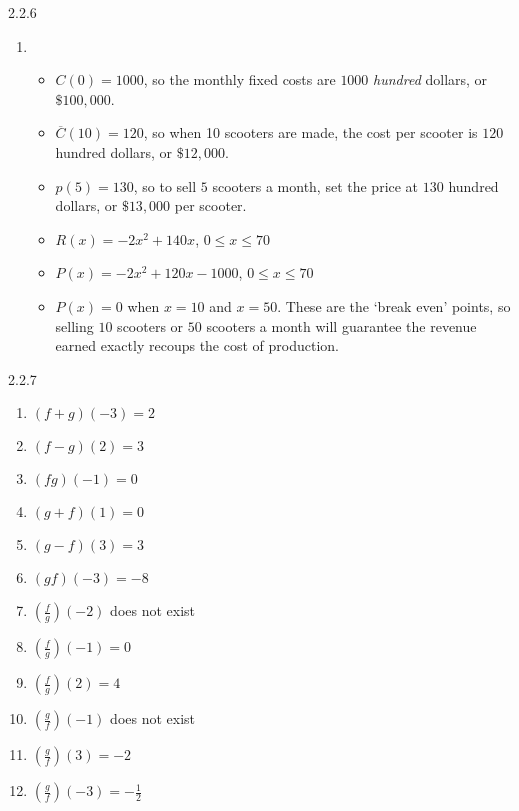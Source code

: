 \begin{Answer}{2.2.6}
\begin{enumerate}
\begin{itemize}
		\end{itemize}

		\item  \begin{itemize}

			\item  $C(0) = 1000$, so the monthly fixed costs are $1000$ \textit{hundred} dollars, or $\$100,\!000$.

			\item  $\overline{C}(10) = 120$, so when 10 scooters are made, the cost per scooter is $120$ hundred dollars, or $\$12,\!000$.

			\item  $p(5) = 130$, so to sell $5$ scooters a month, set the price at $130$ hundred dollars, or $\$13,\!000$ per scooter.

			\item $R(x) = -2x^2+140x$, $0 \leq x \leq 70$

			\item  $P(x) = -2x^2+120x-1000$, $0 \leq x \leq 70$

			\item  $P(x) = 0$ when $x = 10$ and $x=50$.  These are the `break even' points, so selling $10$ scooters or $50$ scooters a month will guarantee the revenue earned exactly recoups the cost of production.

		\end{itemize}

	\end{enumerate}

	
\end{Answer}
\begin{Answer}{2.2.7}

\begin{multicols}{2}
	\begin{enumerate}

		\item $(f + g)(-3) = 2$
		\item $(f - g)(2) = 3$
		\item $(fg)(-1) = 0$
		\item $(g + f)(1) = 0$
		\item $(g - f)(3) = 3$
		\item $(gf)(-3) = -8$
		\item $\left(\frac{f}{g}\right)(-2)$ does not exist
		\item $\left(\frac{f}{g}\right)(-1) = 0$
		\item $\left(\frac{f}{g}\right)(2) = 4$
		\item $\left(\frac{g}{f}\right)(-1)$ does not exist
		\item $\left(\frac{g}{f}\right)(3) = -2$
		\item $\left(\frac{g}{f}\right)(-3) = -\frac{1}{2}$

	\end{enumerate}
\end{multicols}

\end{Answer}
